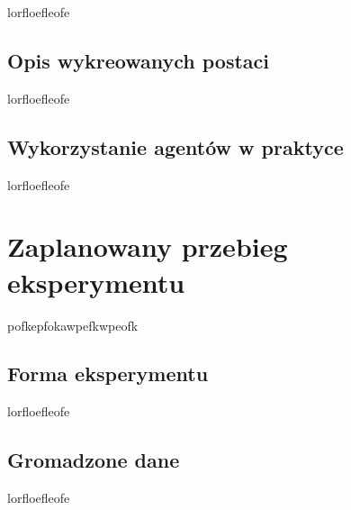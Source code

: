 lorfloefleofe

\subsection*{Opis wykreowanych postaci}

lorfloefleofe

\subsection*{Wykorzystanie agentów w praktyce}

lorfloefleofe

\section{Zaplanowany przebieg eksperymentu}\label{section:ch4_3}

pofkepfokawpefkwpeofk

\subsection*{Forma eksperymentu}

lorfloefleofe

\subsection*{Gromadzone dane}

lorfloefleofe